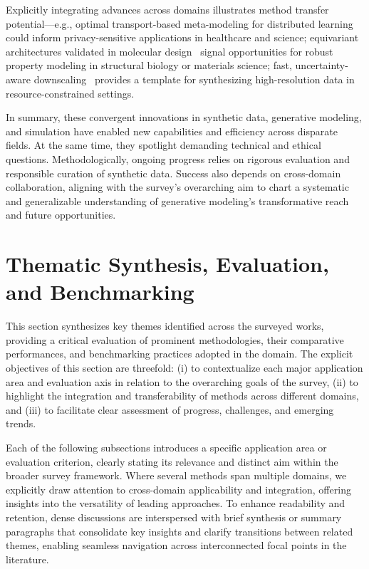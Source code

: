\documentclass[sigconf]{acmart}
\begin{document}
Explicitly integrating advances across domains illustrates method transfer potential—e.g., optimal transport-based meta-modeling for distributed learning~\cite{ref72} could inform privacy-sensitive applications in healthcare and science; equivariant architectures validated in molecular design~\cite{ref59,ref74} signal opportunities for robust property modeling in structural biology or materials science; fast, uncertainty-aware downscaling~\cite{ref73} provides a template for synthesizing high-resolution data in resource-constrained settings. 

In summary, these convergent innovations in synthetic data, generative modeling, and simulation have enabled new capabilities and efficiency across disparate fields. At the same time, they spotlight demanding technical and ethical questions. Methodologically, ongoing progress relies on rigorous evaluation and responsible curation of synthetic data. Success also depends on cross-domain collaboration, aligning with the survey’s overarching aim to chart a systematic and generalizable understanding of generative modeling’s transformative reach and future opportunities.

\section{Thematic Synthesis, Evaluation, and Benchmarking}

This section synthesizes key themes identified across the surveyed works, providing a critical evaluation of prominent methodologies, their comparative performances, and benchmarking practices adopted in the domain. The explicit objectives of this section are threefold: (i) to contextualize each major application area and evaluation axis in relation to the overarching goals of the survey, (ii) to highlight the integration and transferability of methods across different domains, and (iii) to facilitate clear assessment of progress, challenges, and emerging trends. 

Each of the following subsections introduces a specific application area or evaluation criterion, clearly stating its relevance and distinct aim within the broader survey framework. Where several methods span multiple domains, we explicitly draw attention to cross-domain applicability and integration, offering insights into the versatility of leading approaches. To enhance readability and retention, dense discussions are interspersed with brief synthesis or summary paragraphs that consolidate key insights and clarify transitions between related themes, enabling seamless navigation across interconnected focal points in the literature.
\end{document}
